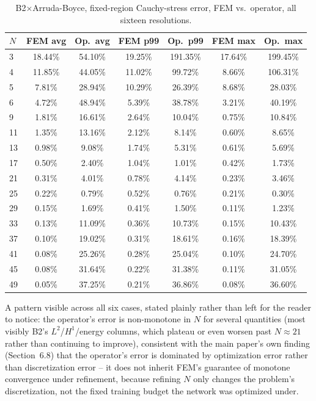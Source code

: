 \documentclass[11pt]{article}
\begin{document}
\begin{table}[h]
\centering
\caption{B2$\times$Arruda-Boyce, fixed-region Cauchy-stress error, FEM
  vs.\ operator, all sixteen resolutions.}
\label{tab:s2-b2ab-b}
\scriptsize
\begin{tabular}{lcccccc}
\toprule
$N$ & FEM avg & Op.\ avg & FEM p99 & Op.\ p99 & FEM max & Op.\ max \\
\midrule
3  & 18.44\% & 54.10\% & 19.25\% & 191.35\% & 17.64\% & 199.45\% \\
4  & 11.85\% & 44.05\% & 11.02\% & 99.72\%  & 8.66\%  & 106.31\% \\
5  & 7.81\%  & 28.94\% & 10.29\% & 26.39\%  & 8.68\%  & 28.03\%  \\
6  & 4.72\%  & 48.94\% & 5.39\%  & 38.78\%  & 3.21\%  & 40.19\%  \\
9  & 1.81\%  & 16.61\% & 2.64\%  & 10.04\%  & 0.75\%  & 10.84\%  \\
11 & 1.35\%  & 13.16\% & 2.12\%  & 8.14\%   & 0.60\%  & 8.65\%   \\
13 & 0.98\%  & 9.08\%  & 1.74\%  & 5.31\%   & 0.61\%  & 5.69\%   \\
17 & 0.50\%  & 2.40\%  & 1.04\%  & 1.01\%   & 0.42\%  & 1.73\%   \\
21 & 0.31\%  & 4.01\%  & 0.78\%  & 4.14\%   & 0.23\%  & 3.46\%   \\
25 & 0.22\%  & 0.79\%  & 0.52\%  & 0.76\%   & 0.21\%  & 0.30\%   \\
29 & 0.15\%  & 1.69\%  & 0.41\%  & 1.50\%   & 0.11\%  & 1.23\%   \\
33 & 0.13\%  & 11.09\% & 0.36\%  & 10.73\%  & 0.15\%  & 10.43\%  \\
37 & 0.10\%  & 19.02\% & 0.31\%  & 18.61\%  & 0.16\%  & 18.39\%  \\
41 & 0.08\%  & 25.26\% & 0.28\%  & 25.04\%  & 0.10\%  & 24.70\%  \\
45 & 0.08\%  & 31.64\% & 0.22\%  & 31.38\%  & 0.11\%  & 31.05\%  \\
49 & 0.05\%  & 37.25\% & 0.21\%  & 36.86\%  & 0.08\%  & 36.60\%  \\
\bottomrule
\end{tabular}
\end{table}

A pattern visible across all six cases, stated plainly rather than left
for the reader to notice: the operator's error is non-monotone in $N$
for several quantities (most visibly B2's $L^2$/$H^1$/energy columns,
which plateau or even worsen past $N{\approx}21$ rather than continuing
to improve), consistent with the main paper's own finding (Section~6.8)
that the operator's error is dominated by optimization error rather than
discretization error -- it does not inherit FEM's guarantee of monotone
convergence under refinement, because refining $N$ only changes the
problem's discretization, not the fixed training budget the network was
optimized under.
\end{document}
